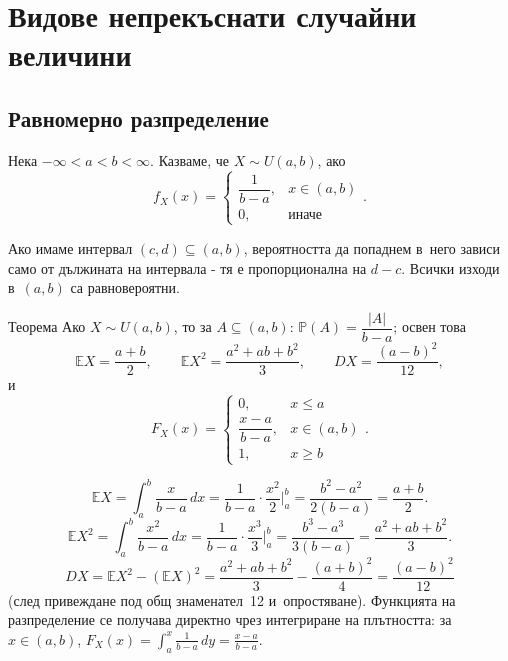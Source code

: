 \chapter{Видове непрекъснати случайни величини}

\section{Равномерно разпределение}

\begin{defbox}
Нека $-\infty<a<b<\infty$. Казваме, че $X\sim U(a,b)$, ако
\[
  f_X(x) = \begin{cases} \dfrac1{b-a}, & x\in(a,b)\\ 0, & \text{иначе}\end{cases}.
\]
\end{defbox}

\begin{rembox}[Идея]
Ако имаме интервал $(c,d)\subseteq(a,b)$, вероятността да попаднем в~него зависи само от дължината на интервала - тя е пропорционална на
$d-c$. Всички изходи в~$(a,b)$ са равновероятни.
\end{rembox}

\begin{thmbox}[]{Теорема}
Ако $X\sim U(a,b)$, то за $A\subseteq(a,b)$: $\mathbb P(A)=
\dfrac{|A|}{b-a}$; освен това
\[
  \mathbb EX = \frac{a+b}{2}, \qquad \mathbb EX^2 = \frac{a^2+ab+b^2}{3}, \qquad DX = \frac{(a-b)^2}{12},
\]
и~\[
  F_X(x) = \begin{cases}0, & x\le a\\ \dfrac{x-a}{b-a}, & x\in(a,b)\\ 1, & x\ge b\end{cases}.
\]
\end{thmbox}

\begin{proofbox}
\[
  \mathbb EX = \int_a^b \frac{x}{b-a}\,dx = \frac1{b-a}\cdot\frac{x^2}2\Big|_a^b = \frac{b^2-a^2}{2(b-a)} = \frac{a+b}{2}.
\]
\[
  \mathbb EX^2 = \int_a^b \frac{x^2}{b-a}\,dx = \frac1{b-a}\cdot\frac{x^3}3\Big|_a^b = \frac{b^3-a^3}{3(b-a)} = \frac{a^2+ab+b^2}{3}.
\]
\[
  DX = \mathbb EX^2-(\mathbb EX)^2 = \frac{a^2+ab+b^2}{3} - \frac{(a+b)^2}{4} = \frac{(a-b)^2}{12}
\]
(след привеждане под общ знаменател~12 и~опростяване). Функцията на
разпределение се получава директно чрез интегриране на плътността:
за $x\in(a,b)$, $F_X(x)=\int_a^x\frac1{b-a}\,dy = \frac{x-a}{b-a}$.
\qedbg
\end{proofbox}

